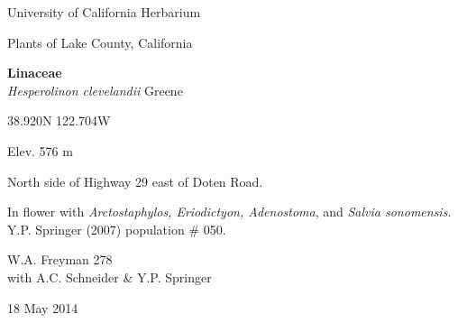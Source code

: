 \documentclass[letterpaper,10pt]{article}
\begin{document}
\begin{minipage}[t]{0.40\textwidth}

\begin{center}
University of California Herbarium \\
\begin{large}
Plants of Lake County, California \\
\end{large}
\vspace{\baselineskip}
\textbf{Linaceae} \\
\textit{Hesperolinon clevelandii} Greene\\
\end{center}

\begin{footnotesize}

\begin{multicols}{2}
38.920\textdegree N 122.704\textdegree W
\columnbreak
\begin{flushright}
Elev. 576 m
\end{flushright}
\end{multicols}

North side of Highway 29 east of Doten Road.
\vspace{\baselineskip}

In flower with \textit{Arctostaphylos, Eriodictyon, Adenostoma}, and \textit{Salvia sonomensis}. Y.P. Springer (2007) population \# 050.

\begin{multicols}{2}
W.A. Freyman 278 \\
with A.C. Schneider \& Y.P. Springer
\columnbreak
\begin{flushright}
18 May 2014
\end{flushright}
\end{multicols}

\end{footnotesize}

\end{minipage}
%
\hspace{2cm}
%
\end{document}
